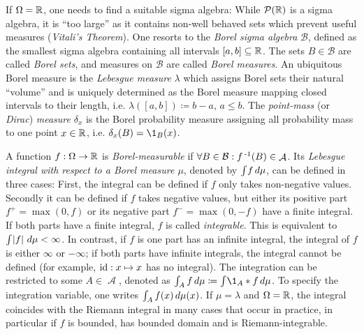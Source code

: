 \documentclass[a4paper,DIV=11,abstracton,twoside=semi]{scrreprt}
\DeclareMathOperator{\A}{\mathcal{A}}
\newcommand{\B}{\mathcal{B}}
\theoremstyle{definition}
\begin{document}
    If $\Omega = \mathbb{R}$, one needs to find a suitable sigma algebra: While $\operatorname{\mathcal{P}}(\mathbb{R})$ is a sigma algebra, it is “too large” as it contains non-well behaved sets which prevent useful measures (\emph{Vitali's Theorem}).
    One resorts to the \emph{Borel sigma algebra} $\B$, defined as the smallest sigma algebra containing all intervals $[a, b] \subseteq \mathbb{R}$.
    The sets $B \in \B$ are called \emph{Borel sets}, and measures on $\B$ are called \emph{Borel measures}.
    An ubiquitous Borel measure is the \emph{Lebesgue measure} $\lambda$ which assigns Borel sets their natural “volume” and is uniquely determined as the Borel measure mapping closed intervals to their length, i.e. $\lambda([a, b]) \coloneqq b-a$, $a \leq b$.
    The \emph{point-mass} (or \emph{Dirac}) \emph{measure} $\delta_x$ is the Borel probability measure assigning all probability mass to one point $x \in \mathbb{R}$, i.e. $\delta_x(B) = \1_B(x)$.
    \cite[p.23, p.45-47, p.177]{bib:billingsleyProbabilityAndMeasure}

    A function $f: \Omega \to \mathbb{R}$ is \emph{Borel-measurable} if $\forall B \in \B: f\inv(B) \in \A$.
    Its \emph{Lebesgue integral with respect to a Borel measure $\mu$}, denoted by $\int_{} f \, d\mu$, can be defined in three cases:
    First, the integral can be defined if $f$ only takes non-negative values.
    Secondly it can be defined if $f$ takes negative values, but either its positive part $f^+ = \max(0, f)$ or its negative part $f^- = \max(0, -f)$ have a finite integral.
    If both parts have a finite integral, $f$ is called \emph{integrable}. This is equivalent to $\int_{} \left| f \right| \, d\mu < \infty$.
    In contrast, if $f$ is one part has an infinite integral, the integral of $f$ is either $\infty$ or $-\infty$; if both parts have infinite integrals, the integral cannot be defined (for example, $\operatorname{id}: x \mapsto x$ has no integral).
    The integration can be restricted to some $A \in \A$, denoted as $\lintegral{A}{f}{\mu} \coloneqq \lintegral{}{\1_A*f}{\mu}$. To specify the integration variable, one writes $\int_{A} f(x) \, d\mu(x)$.
    If $\mu = \lambda$ and $\Omega = \mathbb{R}$, the integral coincides with the Riemann integral in many cases that occur in practice, in particular if $f$ is bounded, has bounded domain and is Riemann-integrable. \cite[Sections 13, 15-17]{bib:billingsleyProbabilityAndMeasure}
    
\end{document}
